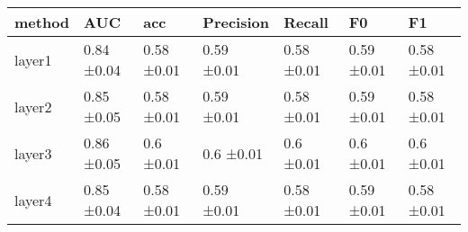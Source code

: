 \begin{tabular}{lllllll}
\toprule
method &        AUC &        acc &  Precision &     Recall &         F0 &         F1 \\
\midrule
layer1 & 0.84 ±0.04 & 0.58 ±0.01 & 0.59 ±0.01 & 0.58 ±0.01 & 0.59 ±0.01 & 0.58 ±0.01 \\
layer2 & 0.85 ±0.05 & 0.58 ±0.01 & 0.59 ±0.01 & 0.58 ±0.01 & 0.59 ±0.01 & 0.58 ±0.01 \\
layer3 & 0.86 ±0.05 &  0.6 ±0.01 &  0.6 ±0.01 &  0.6 ±0.01 &  0.6 ±0.01 &  0.6 ±0.01 \\
layer4 & 0.85 ±0.04 & 0.58 ±0.01 & 0.59 ±0.01 & 0.58 ±0.01 & 0.59 ±0.01 & 0.58 ±0.01 \\
\bottomrule
\end{tabular}
